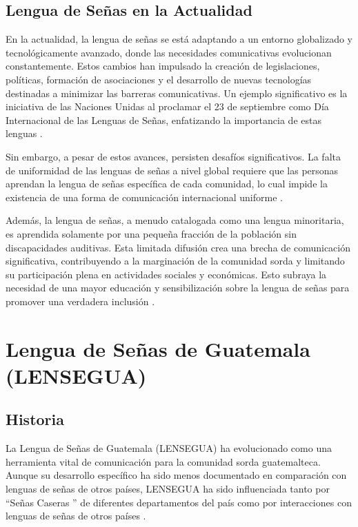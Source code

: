 \subsection{Lengua de Señas en la Actualidad}
En la actualidad, la lengua de señas se está adaptando a un entorno globalizado y tecnológicamente avanzado, donde las necesidades comunicativas evolucionan constantemente. Estos cambios han impulsado la creación de legislaciones, políticas, formación de asociaciones y el desarrollo de nuevas tecnologías destinadas a minimizar las barreras comunicativas. Un ejemplo significativo es la iniciativa de las Naciones Unidas al proclamar el 23 de septiembre como Día Internacional de las Lenguas de Señas, enfatizando la importancia de estas lenguas \cite{Parada2022}.

Sin embargo, a pesar de estos avances, persisten desafíos significativos. La falta de uniformidad de las lenguas de señas a nivel global requiere que las personas aprendan la lengua de señas específica de cada comunidad, lo cual impide la existencia de una forma de comunicación internacional uniforme \cite{RuizVilla2022}.

Además, la lengua de señas, a menudo catalogada como una lengua minoritaria, es aprendida solamente por una pequeña fracción de la población sin discapacidades auditivas. Esta limitada difusión crea una brecha de comunicación significativa, contribuyendo a la marginación de la comunidad sorda y limitando su participación plena en actividades sociales y económicas. Esto subraya la necesidad de una mayor educación y sensibilización sobre la lengua de señas para promover una verdadera inclusión \cite{MelendezLabrador2021}.

\section{Lengua de Señas de Guatemala (LENSEGUA)}
\subsection{Historia}
La Lengua de Señas de Guatemala (LENSEGUA) ha evolucionado como una herramienta vital de comunicación para la comunidad sorda guatemalteca. Aunque su desarrollo específico ha sido menos documentado en comparación con lenguas de señas de otros países, LENSEGUA ha sido influenciada tanto por “Señas Caseras ” de diferentes departamentos del país como por interacciones con lenguas de señas de otros países \cite{Aroche2022} \cite{EndangeredLanguages}.

